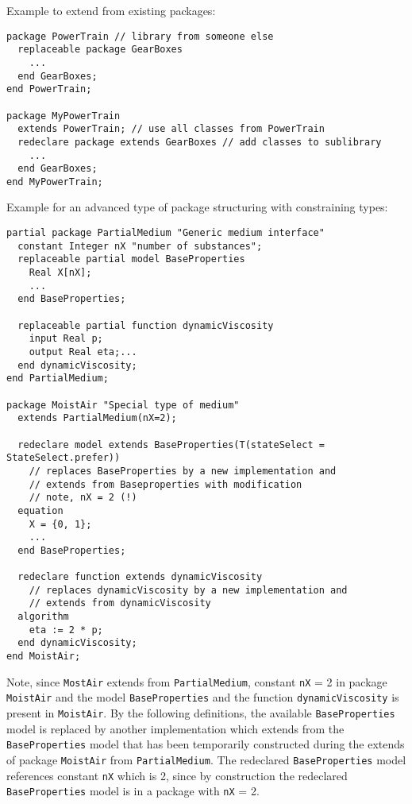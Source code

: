 \begin{nonnormative}
Example to extend from existing packages:
\begin{lstlisting}[language=modelica]
package PowerTrain // library from someone else
  replaceable package GearBoxes
    ...
  end GearBoxes;
end PowerTrain;

package MyPowerTrain
  extends PowerTrain; // use all classes from PowerTrain
  redeclare package extends GearBoxes // add classes to sublibrary
    ...
  end GearBoxes;
end MyPowerTrain;
\end{lstlisting}

Example for an advanced type of package structuring with constraining types:
\begin{lstlisting}[language=modelica]
partial package PartialMedium "Generic medium interface"
  constant Integer nX "number of substances";
  replaceable partial model BaseProperties
    Real X[nX];
    ...
  end BaseProperties;

  replaceable partial function dynamicViscosity
    input Real p;
    output Real eta;...
  end dynamicViscosity;
end PartialMedium;

package MoistAir "Special type of medium"
  extends PartialMedium(nX=2);

  redeclare model extends BaseProperties(T(stateSelect = StateSelect.prefer))
    // replaces BaseProperties by a new implementation and
    // extends from Baseproperties with modification
    // note, nX = 2 (!)
  equation
    X = {0, 1};
    ...
  end BaseProperties;

  redeclare function extends dynamicViscosity
    // replaces dynamicViscosity by a new implementation and
    // extends from dynamicViscosity
  algorithm
    eta := 2 * p;
  end dynamicViscosity;
end MoistAir;
\end{lstlisting}

Note, since \lstinline!MostAir! extends from \lstinline!PartialMedium!,
constant \lstinline!nX! = 2 in package \lstinline!MoistAir! and the model
\lstinline!BaseProperties! and the function \lstinline!dynamicViscosity! is present
in \lstinline!MoistAir!. By the following definitions, the available
\lstinline!BaseProperties! model is replaced by another implementation which
extends from the \lstinline!BaseProperties! model that has been temporarily
constructed during the extends of package \lstinline!MoistAir! from
\lstinline!PartialMedium!. The redeclared \lstinline!BaseProperties! model
references constant \lstinline!nX! which is 2, since by construction the
redeclared \lstinline!BaseProperties! model is in a package with \lstinline!nX! = 2.


\end{nonnormative}
